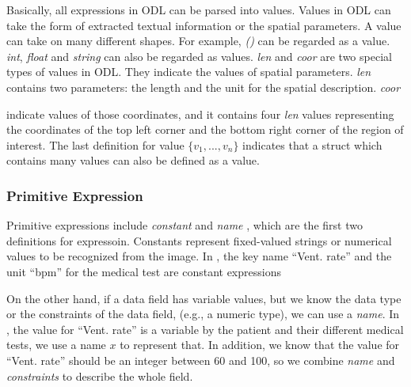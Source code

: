 Basically, all expressions in ODL can be parsed into values. Values 
in ODL can take the form of extracted textual information or the spatial parameters. 
A value can take on many different shapes. 
For example, {\em ()} can be regarded as a value.
{\em int}, 
{\em float} and {\em string} can also be regarded as values.
{\em len} and {\em coor} are two special types of values in ODL. 
They indicate the values of spatial parameters. {\em len} 
contains two parameters: the  length and the unit for the spatial description. 
{\em coor} {indicate  values of those
coordinates, and it contains four {\em len} values representing 
the coordinates of the top left corner and the bottom right corner of 
the region of interest. The last definition for value  
{\em $\{v_1, ..., v_n\}$} indicates that a struct which contains many 
values can also be defined as a value. 

\subsubsection{Primitive Expression}
Primitive expressions include {\em constant} and {\em name} , which are the first two definitions for expressoin.
Constants represent fixed-valued strings or numerical values to be recognized from the 
image. In , the key name ``Vent. rate'' and the unit 
``bpm'' for the medical test are constant expressions 

On the other hand, if a data field has variable values,
but we know the data type or the constraints of the data field,
(e.g., a numeric type), we can use a {\em name}. 
In , the value for ``Vent. rate'' is a variable by
the patient and their different medical tests, we use a name $x$ to represent that. 
In addition, we know that the value for ``Vent. rate'' should be an integer 
between 60 and 100, so we combine {\em name} and {\em constraints} 
to describe the whole field. 

}

